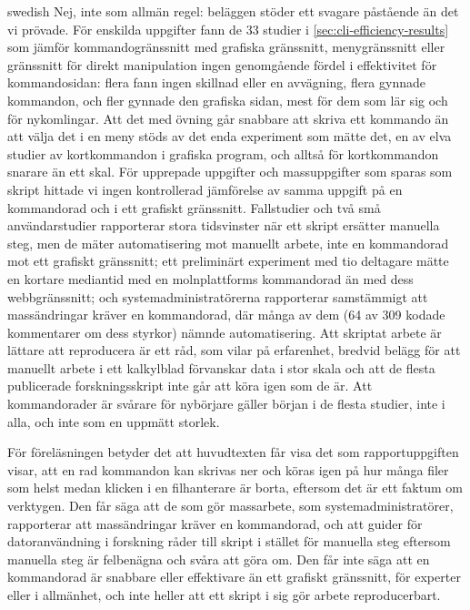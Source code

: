\begin{onlyin}{swedish}
Nej, inte som allmän regel: beläggen stöder ett svagare påstående än det
vi prövade.  För enskilda uppgifter fann de 33 studier i
\cref{sec:cli-efficiency-results} som jämför kommandogränssnitt med
grafiska gränssnitt, menygränssnitt eller gränssnitt för direkt
manipulation ingen genomgående fördel i effektivitet för kommandosidan:
flera fann ingen skillnad eller en avvägning, flera gynnade kommandon,
och fler gynnade den grafiska sidan, mest för dem som lär sig och för
nykomlingar.  Att det med övning går snabbare att skriva ett kommando än
att välja det i en meny stöds av det enda experiment som mätte det, en
av elva studier av kortkommandon i grafiska program, och alltså för
kortkommandon snarare än ett skal.  För upprepade uppgifter och
massuppgifter som sparas som skript hittade vi ingen kontrollerad
jämförelse av samma uppgift på en kommandorad och i ett grafiskt
gränssnitt.  Fallstudier och två små användarstudier rapporterar stora
tidsvinster när ett skript ersätter manuella steg, men de mäter
automatisering mot manuellt arbete, inte en kommandorad mot ett grafiskt
gränssnitt; ett preliminärt experiment med tio deltagare mätte en kortare
mediantid med en molnplattforms kommandorad än med dess webbgränssnitt;
och
systemadministratörerna rapporterar samstämmigt att massändringar kräver
en kommandorad, där många av dem (64 av 309 kodade kommentarer om dess
styrkor) nämnde automatisering.  Att
skriptat arbete är lättare att reproducera är ett råd,
som vilar på erfarenhet, bredvid belägg för att manuellt arbete i ett
kalkylblad förvanskar data i stor skala och att de flesta publicerade
forskningsskript inte går att köra igen som de är.  Att kommandorader
är svårare för nybörjare gäller början i de flesta studier, inte i
alla, och inte som en uppmätt storlek.

För föreläsningen betyder det att huvudtexten får visa det som
rapportuppgiften visar, att en rad kommandon kan skrivas ner och köras
igen på hur många filer som helst medan klicken i en filhanterare är
borta, eftersom det är ett faktum om verktygen.  Den får säga att de
som gör massarbete, som systemadministratörer, rapporterar att
massändringar kräver en kommandorad, och att guider för
datoranvändning i forskning råder till skript i stället för manuella
steg eftersom manuella steg är felbenägna och svåra att göra om.  Den får
inte säga att en kommandorad är snabbare eller effektivare än ett
grafiskt gränssnitt, för experter eller i allmänhet, och inte heller att
ett skript i sig gör arbete reproducerbart.
\end{onlyin}

